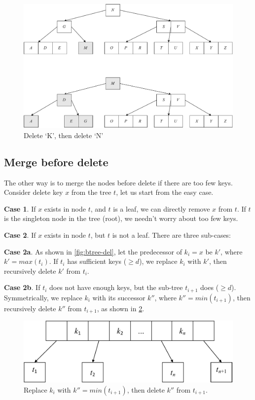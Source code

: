 \documentclass[b5paper]{article}
\begin{document}
\begin{figure}[htbp]
  \centering
  \includegraphics[scale=0.5]{img/btree-del-KN}
  \caption{Delete `K', then delete `N'}
  \label{fig:btree-del-KN}
\end{figure}

\subsection{Merge before delete}

The other way is to merge the nodes before delete if there are too few keys. Consider delete key $x$ from the tree $t$, let us start from the easy case.

\textbf{Case 1}. If $x$ exists in node $t$, and $t$ is a leaf, we can directly remove $x$ from $t$. If $t$ is the singleton node in the tree (root), we needn't worry about too few keys.

\textbf{Case 2}. If $x$ exists in node $t$, but $t$ is not a leaf. There are three sub-cases:

\textbf{Case 2a}. As shown in \cref{fig:btree-del}, let the predecessor of $k_i = x$ be $k'$, where $k' = max(t_i)$. If $t_i$ has sufficient keys ($\geq d$), we replace $k_i$ with $k'$, then recursively delete $k'$ from $t_i$.

\textbf{Case 2b}. If $t_i$ does not have enough keys, but the sub-tree $t_{i+1}$ does ($\geq d$). Symmetrically, we replace $k_i$ with its successor $k''$, where $k'' = min(t_{i+1})$, then recursively delete $k''$ from $t_{i+1}$, as shown in \cref{fig:btree-del-case2b}.

\begin{figure}[htbp]
  \centering
  \includegraphics[scale=0.5, page=7]{img/btrees}
  \caption{Replace $k_i$ with $k'' = min(t_{i+1})$, then delete $k''$ from $t_{i+1}$.}
  \label{fig:btree-del-case2b}
\end{figure}
\end{document}
